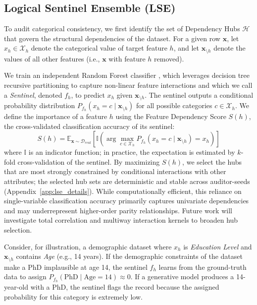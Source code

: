 \documentclass[pdflatex,sn-mathphys-num]{sn-jnl}
\theoremstyle{thmstyleone}%
\theoremstyle{thmstyletwo}%
\theoremstyle{thmstylethree}%
\begin{document}
\subsection{Logical Sentinel Ensemble (LSE)}

To audit categorical consistency, we first identify the set of Dependency Hubs $\mathcal{H}$ that govern the structural dependencies of the dataset. For a given row $\mathbf{x}$, let $x_h \in \mathcal{X}_h$ denote the categorical value of target feature $h$, and let $\mathbf{x}_{\setminus h}$ denote the values of all other features (i.e., $\mathbf{x}$ with feature $h$ removed).

We train an independent Random Forest classifier \cite{breiman2001random}, which leverages decision tree recursive partitioning to capture non-linear feature interactions \cite{friedman2008predictive} and which we call a \textit{Sentinel}, denoted $f_h$, to predict $x_h$ given $\mathbf{x}_{\setminus h}$. The sentinel outputs a conditional probability distribution $P_{f_h}(x_h = c \mid \mathbf{x}_{\setminus h})$ for all possible categories $c \in \mathcal{X}_h$. We define the importance of a feature $h$ using the Feature Dependency Score $S(h)$, the cross-validated classification accuracy of its sentinel:
\begin{equation}
    S(h) = \mathbb{E}_{\mathbf{x} \sim \mathcal{D}_{real}} \left[ \mathbb{I} \left( \arg\max_{c \in \mathcal{X}_h} P_{f_h}(x_h=c \mid \mathbf{x}_{\setminus h}) = x_h \right) \right]
\end{equation}
where $\mathbb{I}$ is an indicator function; in practice, the expectation is estimated by $k$-fold cross-validation of the sentinel. By maximizing $S(h)$, we select the hubs that are most strongly constrained by conditional interactions with other attributes; the selected hub sets are deterministic and stable across auditor-seeds (Appendix~\ref{app:lse_details}). While computationally efficient, this reliance on single-variable classification accuracy primarily captures univariate dependencies and may underrepresent higher-order parity relationships. Future work will investigate total correlation and multiway interaction kernels to broaden hub selection.

Consider, for illustration, a demographic dataset where $x_h$ is \textit{Education Level} and $\mathbf{x}_{\setminus h}$ contains \textit{Age} (e.g., 14 years). If the demographic constraints of the dataset make a PhD implausible at age 14, the sentinel $f_h$ learns from the ground-truth data to assign $P_{f_h}(\text{PhD} \mid \text{Age}=14) \approx 0$. If a generative model produces a 14-year-old with a PhD, the sentinel flags the record because the assigned probability for this category is extremely low.
\end{document}
